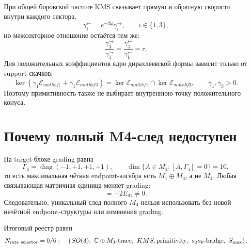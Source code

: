 При общей боровской частоте KMS связывает прямую и обратную скорости внутри
каждого сектора,
\begin{equation}
 \gamma_i^{\leftarrow}=e^{-\beta\omega}\gamma_i^{\rightarrow},
 \qquad i\in\{1,3\},
 \label{eq:v8-baryon-c0-singlet-triplet-kms-pair-ratios}
\end{equation}
но межсекторное отношение остаётся тем же:
\begin{equation}
 \frac{\gamma_3^{\rightarrow}}{\gamma_1^{\rightarrow}}
 =\frac{\gamma_3^{\leftarrow}}{\gamma_1^{\leftarrow}}=r.
 \label{eq:v8-baryon-c0-kms-does-not-select-relative-rate}
\end{equation}
Для положительных коэффициентов ядро дирахлеевской формы зависит только от
support скачков:
\begin{equation}
 \ker(\gamma_1\mathcal E_{mathbf1}+\gamma_3\mathcal E_{mathbf3})
 =\ker\mathcal E_{mathbf1}\cap\ker\mathcal E_{mathbf3},
 \qquad \gamma_1,\gamma_3>0.
 \label{eq:v8-baryon-c0-primitivity-independent-of-positive-rate-ratio}
\end{equation}
Поэтому примитивность также не выбирает внутреннюю точку положительного
конуса.

\section{Почему полный M4-след недоступен}

На target-блоке grading равна
\begin{equation}
 \Gamma_4=\operatorname{diag}(-1,+1,+1,+1),
 \qquad \dim\{A\in M_4:[A,\Gamma_4]=0\}=10,
 \label{eq:v8-baryon-c0-singlet-triplet-even-endpoint-algebra-dimension}
\end{equation}
то есть максимальная чётная endpoint-алгебра есть
$M_1\oplus M_3$, а не $M_4$. Любая связывающая матричная единица меняет
grading:
\begin{equation}
 [\Gamma_4,E_{01}]=-2E_{01}\ne0.
 \label{eq:v8-baryon-c0-m4-cross-block-grading-obstruction}
\end{equation}
Следовательно, уникальный след полного $M_4$ нельзя использовать без новой
нечётной endpoint-структуры или изменения grading.

Итоговый реестр равен
\begin{equation}
 N_{\rm rate\ selector}=0/6:
 \quad\{SO(3),\ \mathbb C\oplus M_3\text{-trace},\ KMS,
 \text{primitivity},\ s_0a_0\text{-bridge},\ S_{\max}\}.
 \label{eq:v8-baryon-c0-singlet-triplet-rate-selector-ledger}
\end{equation}

